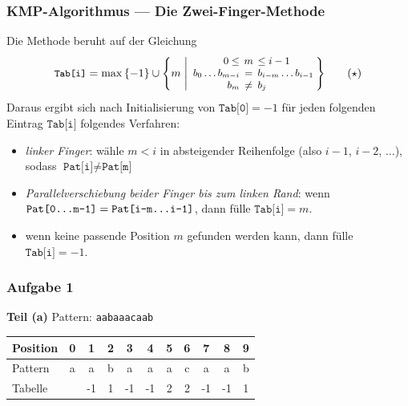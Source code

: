 \documentclass{beamer}
\begin{document}
\begin{frame} \frametitle{KMP-Algorithmus --- Die Zwei-Finger-Methode}
	Die Methode beruht auf der Gleichung
	\begin{equation*}
		\begin{aligned}
		\small
		\texttt{Tab[i]}
		= \max \menge{-1} \cup \menge{m \; \middle| \;
			\setlength{\arraycolsep}{2pt}
			 \begin{array}{rcl}
				0 \le &m& \le i-1 \\
				b_0 \dots b_{m-i} &=& b_{i-m} \dots b_{i-1} \\
				b_m &\neq& b_j \\
			\end{array} }
		\end{aligned} \tag{$\star$} \label{eq: kmp}
	\end{equation*}
	Daraus ergibt sich nach Initialisierung von $\texttt{Tab[0]} = -1$ für jeden folgenden Eintrag $\texttt{Tab[i]}$ folgendes Verfahren:
	\begin{itemize}
		\item \textit{linker Finger}: wähle $m < i$ in absteigender Reihenfolge (also $i-1$, $i-2$, $\dots$), sodass $\texttt{Pat[i]} \neq \texttt{Pat[m]}$
		\item \textit{Parallelverschiebung beider Finger bis zum linken Rand}: wenn $\texttt{Pat[0\dots m-1]} = \texttt{Pat[i-m\dots i-1]}$, dann fülle $\texttt{Tab[i]} = m$.
		\item wenn keine passende Position $m$ gefunden werden kann, dann fülle $\texttt{Tab[i]} = -1$.
	\end{itemize}
\end{frame}


\begin{frame} \frametitle{Aufgabe 1 \hfill {}}
	\textbf{Teil (a)} \hspace{3em}
	Pattern: {\large \texttt{aabaaacaab}} \\[1em]
	
	\begin{center}
		\renewcommand*{\arraystretch}{1.3} \setlength{\tabcolsep}{8pt}
		\begin{tabular}{l|cccccccccc}
			Position &  0 &  1 &  2 &  3 &  4 &  5 &  6 &  7 &  8 &  9 \\ \hline
			Pattern  &  a &  a &  b &  a &  a &  a &  c &  a &  a &  b \\ \hline
			Tabelle  & \only<2->{-1 & -1 &  1 & -1 & -1 &  2 &  2 & -1 & -1 &  1} \\
		\end{tabular}
	\end{center}
\end{frame}
\end{document}
